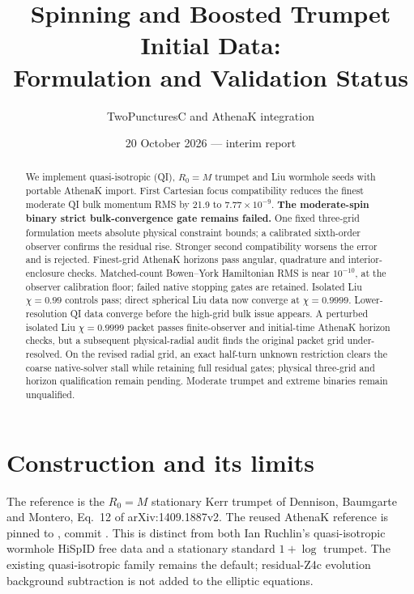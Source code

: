 \documentclass[aps,prd,preprint,notitlepage,nofootinbib]{revtex4-2}
\begin{document}
\title{Spinning and Boosted Trumpet Initial Data:\\Formulation and Validation Status}
\author{TwoPuncturesC and AthenaK integration}
\date{20 October 2026 --- interim report}
\begin{abstract}
We implement quasi-isotropic (QI), $R_0=M$ trumpet and Liu wormhole seeds
with portable AthenaK import. First Cartesian focus compatibility reduces
the finest moderate QI bulk momentum RMS by 21.9 to $7.77\times10^{-9}$.
\textbf{The moderate-spin binary strict bulk-convergence gate remains failed.} One fixed
three-grid formulation meets absolute physical constraint bounds; a
calibrated sixth-order observer confirms the residual rise. Stronger second
compatibility worsens the error and is rejected. Finest-grid AthenaK horizons
pass angular, quadrature and interior-enclosure checks. Matched-count
Bowen--York Hamiltonian RMS is near $10^{-10}$, at the observer calibration
floor; failed native stopping gates are retained. Isolated Liu $\chi=0.99$
controls pass; direct spherical Liu data now converge at $\chi=0.9999$. Lower-resolution QI data converge before the high-grid bulk issue appears. A perturbed isolated Liu $\chi=0.9999$ packet passes finite-observer and initial-time AthenaK horizon checks, but a subsequent physical-radial audit finds the original packet grid under-resolved. On the revised radial grid, an exact half-turn unknown restriction clears the coarse native-solver stall while retaining full residual gates; physical three-grid and horizon qualification remain pending. Moderate trumpet and extreme binaries remain unqualified.
\end{abstract}
\maketitle

\section{Construction and its limits}
The reference is the $R_0=M$ stationary Kerr trumpet of Dennison, Baumgarte and
Montero, Eq.~12 of arXiv:1409.1887v2. The reused AthenaK reference is pinned to
, commit
.
This is distinct from both Ian Ruchlin's quasi-isotropic wormhole HiSpID free data
and a stationary standard $1+\log$ trumpet. The existing quasi-isotropic family
remains the default; residual-Z4c evolution background subtraction is not added
to the elliptic equations.
\end{document}
